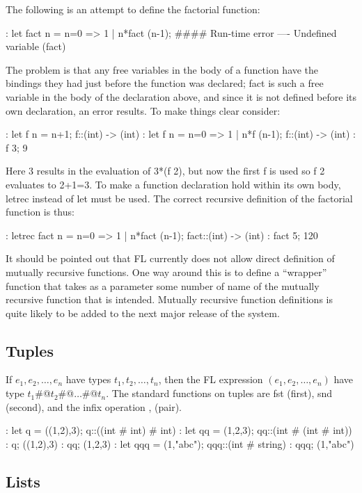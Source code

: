 The following is an attempt to define the factorial function:
\begin{hol}
: let fact n = n=0 => 1 | n*fact (n-1);
#### Run-time error
---- Undefined variable (fact)
\end{hol}
The problem is that any free variables in the body of a function have
the bindings they had
just before the function was declared; fact is such a free variable
in the body of the declaration
above, and since it is not defined before its own declaration, an error
results. To make things
clear consider:
\begin{hol}
: let f n = n+1;
f::(int) -> (int)
: let f n = n=0 => 1 | n*f (n-1);
f::(int) -> (int)
: f 3;
9
\end{hol}
Here 3 results in the evaluation of 3*(f 2), but now the first f is
used so f 2 evaluates to
2+1=3. To make a function declaration hold within its own body, letrec
instead of let must be
used. The correct recursive definition of the factorial function is thus:
\begin{hol}
: letrec fact n = n=0 => 1 | n*fact (n-1);
fact::(int) -> (int)
: fact 5;
120
\end{hol}

It should be pointed out that FL currently does not allow direct definition
of mutually recursive functions.
One way around this is to define a ``wrapper'' function that takes as a
parameter some number of name of the mutually recursive function that
is intended.
Mutually recursive function definitions is quite likely to be added to
the next major release of the system.

\subsection{Tuples}

If $e_1, e_2, \ldots , e_n$ have types $t_1, t_2, \ldots , t_n$, then
the FL expression $(e_1, e_2, \ldots , e_n)$ have type
$t_1$\verb@#@$t_2$\verb@#@$\ldots$\verb@#@$t_n$.
The standard functions on tuples are fst (first), snd (second), and the infix
operation , (pair).
\begin{hol}
: let q = ((1,2),3);
q::((int # int) # int)
: let qq = (1,2,3);
qq::(int # (int # int))
: q;
((1,2),3)
: qq;
(1,2,3)
: let qqq = (1,"abc");
qqq::(int # string)
: qqq;
(1,"abc")
\end{hol}

\subsection{Lists}

